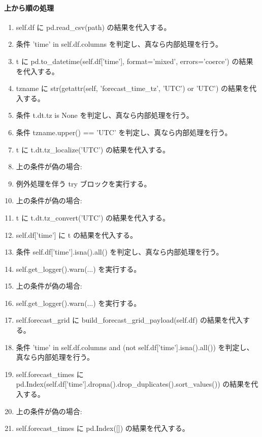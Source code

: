 \documentclass[a4paper,11pt]{article}
\begin{document}
            \paragraph{上から順の処理}
            \begin{enumerate}[leftmargin=1.8em]
            \item self.df に pd.read\_csv(path) の結果を代入する。
\item 条件 'time' in self.df.columns を判定し、真なら内部処理を行う。
\item   t に pd.to\_datetime(self.df['time'], format='mixed', errors='coerce') の結果を代入する。
\item   tzname に str(getattr(self, 'forecast\_time\_tz', 'UTC') or 'UTC') の結果を代入する。
\item   条件 t.dt.tz is None を判定し、真なら内部処理を行う。
\item     条件 tzname.upper() == 'UTC' を判定し、真なら内部処理を行う。
\item       t に t.dt.tz\_localize('UTC') の結果を代入する。
\item       上の条件が偽の場合:
\item       例外処理を伴う try ブロックを実行する。
\item     上の条件が偽の場合:
\item     t に t.dt.tz\_convert('UTC') の結果を代入する。
\item   self.df['time'] に t の結果を代入する。
\item   条件 self.df['time'].isna().all() を判定し、真なら内部処理を行う。
\item     self.get\_logger().warn(...) を実行する。
\item   上の条件が偽の場合:
\item   self.get\_logger().warn(...) を実行する。
\item self.forecast\_grid に build\_forecast\_grid\_payload(self.df) の結果を代入する。
\item 条件 'time' in self.df.columns and (not self.df['time'].isna().all()) を判定し、真なら内部処理を行う。
\item   self.forecast\_times に pd.Index(self.df['time'].dropna().drop\_duplicates().sort\_values()) の結果を代入する。
\item   上の条件が偽の場合:
\item   self.forecast\_times に pd.Index([]) の結果を代入する。
            \end{enumerate}
\end{document}
